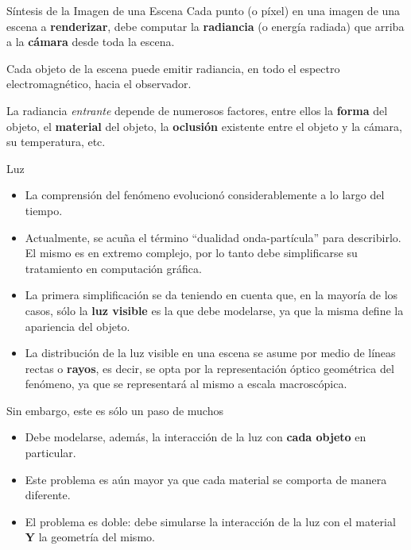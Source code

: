 \documentclass[spanish]{beamer}
\begin{document}
\begin{frame}{Síntesis de la Imagen de una Escena}
Cada punto (o píxel) en una imagen de una escena a \textbf{renderizar}, debe computar la \textbf{radiancia} (o energía radiada) que arriba a la \textbf{cámara} desde toda la escena.

Cada objeto de la escena puede emitir radiancia, en todo el espectro electromagnético, hacia el observador.

La radiancia \textit{entrante} depende de numerosos factores, entre ellos la \textbf{forma} del objeto, el \textbf{material} del objeto, la \textbf{oclusión} existente entre el objeto y la cámara, su temperatura, etc.
\end{frame}



\begin{frame}[Luz]
\begin{block}{Luz}
\begin{itemize}
\item La comprensión del fenómeno evolucionó considerablemente a lo largo del tiempo.
\item Actualmente, se acuña el término ``dualidad onda-partícula'' para describirlo. El mismo es en extremo complejo, por lo tanto debe simplificarse su tratamiento en computación gráfica.
\item La primera simplificación se da teniendo en cuenta que, en la mayoría de los casos, sólo la \textbf{luz visible} es la que debe modelarse, ya que la misma define la apariencia del objeto.
\item La distribución de la luz visible en una escena se asume por medio de líneas rectas o \textbf{rayos}, es decir, se opta por la representación óptico geométrica del fenómeno, ya que se representará al mismo a escala macroscópica.
\end{itemize}
\end{block}
\end{frame}

\begin{frame}{}

\centering

\begin{block}{Sin embargo, este es sólo un paso de muchos}
\begin{itemize}
\item Debe modelarse, además, la interacción de la luz con \textbf{cada objeto} en particular.
\item Este problema es aún mayor ya que cada material se comporta de manera diferente.
\item El problema es doble: debe simularse la interacción de la luz con el material \textbf{Y} la geometría del mismo.
\end{itemize}
\end{block}

\end{frame}
\end{document}
